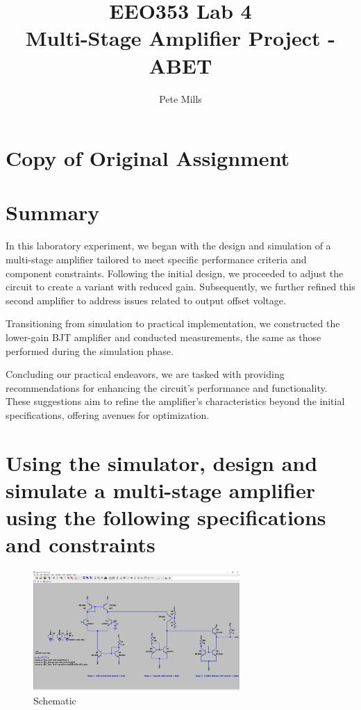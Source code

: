 \documentclass{article}
\begin{document}
	
	
	\title{EEO353 Lab 4\\ Multi-Stage Amplifier Project - ABET}
	\author{Pete Mills}
	
	\maketitle
	
	\section*{Copy of Original Assignment}
	
	
	
	
	\section*{Summary}
	
	In this laboratory experiment, we began with the design and simulation of a multi-stage amplifier tailored to meet specific performance criteria and component constraints. Following the initial design, we proceeded to adjust the circuit to create a variant with reduced gain. Subsequently, we further refined this second amplifier to address issues related to output offset voltage.

Transitioning from simulation to practical implementation, we constructed the lower-gain BJT amplifier and conducted  measurements, the same as those performed during the simulation phase.

Concluding our practical endeavors, we are tasked with providing recommendations for enhancing the circuit's performance and functionality. These suggestions aim to refine the amplifier's characteristics beyond the initial specifications, offering avenues for optimization.
	

	\section{Using the simulator, design and simulate a multi-stage amplifier using the following specifications and constraints}

	\begin{figure}[H]
	    \centering
	    \includegraphics[width=0.7\textwidth]{t1-sch}
	    \caption{Schematic}
	\end{figure}
	
\end{document}
